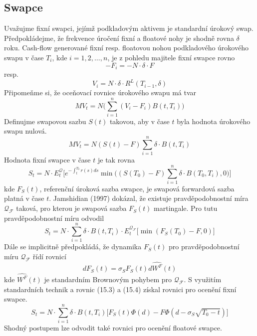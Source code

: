 \documentclass[a4paper]{book}
\begin{document}
\subsection{Swapce}

Uvažujme fixní swapci, jejímž podkladovým aktivem je standardní úrokový swap. Předpokládejme, že frekvence úročení fixní a floatové nohy je shodně rovna $\delta$ roku. Cash-flow generované fixní resp. floatovou nohou podkladového úrokového swapu v čase $T_i$, kde $i = 1, 2, \dots, n$, je z pohledu majitele fixní swapce rovno
\begin{equation*}
-F_i = -N \cdot \delta \cdot F
\end{equation*}
resp.
\begin{equation*}
V_i = N \cdot \delta \cdot R^L(T_{i-1}, \delta)
\end{equation*}
Připomeňme si, že oceňovací rovnice úrokového swapu má tvar
\begin{equation*}
MV_t = N \Bigg( \sum_{i=1}^n (V_i - F_i) B(t, T_i) \Bigg)
\end{equation*}
Definujme swapovou sazbu $S(t)$ takovou, aby v čase $t$ byla hodnota úrokového swapu nulová.
\begin{equation*}
MV_t = N (S(t) - F) \sum_{i=1}^n \delta \cdot B(t, T_i)
\end{equation*}
Hodnota fixní swapce v čase $t$ je tak rovna
\begin{equation*}
S_t = N \cdot E_t^{\mathcal{Q}} \Big[ e^{-\int_t^{T_0}r(s)ds} \min \Big((S(T_0) - F) \sum_{i=1}^n \delta \cdot B(T_0, T_i), 0 \Big)\Big]
\end{equation*}
kde $F_S(t)$, referenční úroková sazba swapce, je swapová forwardová sazba platná v čase $t$. Jamshidian (1997) dokázal, že existuje pravděpodobnostní míra $\mathcal{Q_F}$ taková, pro kterou je swapová sazba $F_S(t)$ martingale. Pro tutu pravděpodobnostní míru odvodil
\begin{equation}
S_t = N \cdot \sum_{i=1}^n \delta \cdot B(t, T_i) \cdot E_t^{\mathcal{Q_F}} \big[ \min(F_S(T_0) - F, 0) \big]
\end{equation}
Dále se implicitně předpokládá, že dynamika $F_S(t)$ pro pravděpodobnostní míru $\mathcal{Q_F}$ řídí rovnicí
\begin{equation}
d F_S(t) = \sigma_S F_S(t) d \hat{W^F}(t)
\end{equation}
kde $\hat{W^F}(t)$ je standardním Brownovým pohybem pro $\mathcal{Q_F}$. S využitím standardních technik a rovnic (15.3) a (15.4) získal rovnici pro ocenění fixní swapce.
\begin{equation*}
S_t = N \cdot \sum_{i=1}^n \delta \cdot B(t, T_i) \big[ F_S(t)\Phi(d) - F \Phi(d - \sigma_S \sqrt{T_0 - t})\big]
\end{equation*}
Shodný postupem lze odvodit také rovnici pro ocenění floatové swapce.
\end{document}

